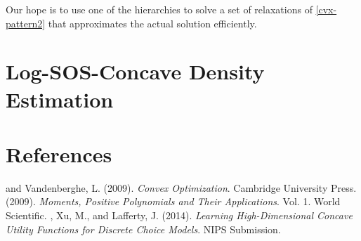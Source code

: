 \documentclass[11pt]{article}
\begin{document}
Our hope is to use one of the hierarchies to solve a set of relaxations of \eqref{cvx-pattern2} that approximates the actual solution efficiently.

\clearpage
\section{Log-SOS-Concave Density Estimation}

%
%

\clearpage
\section*{References}
\beginrefs
{} and {\sc Vandenberghe, L.} (2009).
{\it Convex Optimization}.
Cambridge University Press.
 (2009).
{\it Moments, Positive Polynomials and Their Applications}. Vol. 1. 
World Scientific.
, {\sc Xu, M.}, and {\sc Lafferty, J.} (2014).
{\it Learning High-Dimensional Concave Utility Functions for Discrete Choice Models}.
NIPS Submission.
\endrefs



\end{document}
